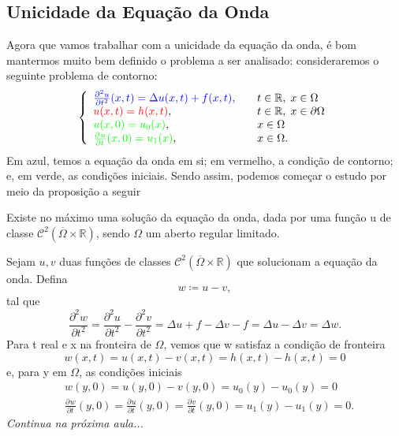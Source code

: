 \documentclass[../pde_notes.tex]{subfiles}
\begin{document}
\subsection{Unicidade da Equação da Onda}
Agora que vamos trabalhar com a unicidade da equação da onda, é bom mantermos muito bem definido o problema a ser analisado: consideraremos o seguinte problema de contorno:
\[
	\left\{\begin{array}{ll}
		{\color{blue}\frac{\partial^{2}u}{\partial t^{2}}(x, t) = \Delta u(x, t) + f(x, t),} & \quad t\in \mathbb{R},\; x\in \Omega           \\
		{\color{red}u(x, t) = h(x, t)},                                                      & \quad t\in \mathbb{R}, \; x\in \partial \Omega \\
		{\color{green}u(x, 0) = u_{0}(x)},                                                   & \quad x\in \Omega                              \\
		{\color{green}\frac{\partial^{}u}{\partial t^{}}(x, 0) = u_1(x)},                    & \quad x\in \Omega .
	\end{array}\right.
\]
Em azul, temos a {\color{blue} equação da onda em si}; em vermelho, a {\color{red}condição de contorno}; e, em verde, as {\color{green}condições iniciais}.
Sendo assim, podemos começar o estudo por meio da proposição a seguir

\begin{prop*}
	Existe no máximo uma solução da equação da onda, dada por uma função u de classe \(\mathcal{C}^{2}(\overline{\Omega }\times \mathbb{R})\), sendo \(\Omega \) um aberto regular limitado.
\end{prop*}
\begin{proof*}
	Sejam \(u, v\) duas funções de classes \(\mathcal{C}^{2}(\overline{\Omega }\times \mathbb{R})\) que solucionam a equação da onda. Defina
	\[
		w\coloneqq u - v,
	\]
	tal que
	\[
		\frac{\partial^{2}w}{\partial t^{2}} = \frac{\partial^{2}u}{\partial t^{2}} - \frac{\partial^{2}v}{\partial t^{2}} = \Delta u + f - \Delta v - f = \Delta u - \Delta v = \Delta w.
	\]
	Para t real e x na fronteira de \(\Omega \), vemos que w satisfaz a condição de fronteira
	\[
		w(x, t) = u(x, t) - v(x, t) = h(x, t) - h (x, t) = 0
	\]
	e, para y em \(\Omega \), as condições iniciais
	\begin{align*}
		 & w(y, 0) = u(y, 0) - v(y, 0) = u_{0}(y) - u_{0}(y) = 0                                                                                                 \\
		 & \frac{\partial^{}w}{\partial t^{}}(y, 0) = \frac{\partial^{}u}{\partial t^{}}(y, 0) = \frac{\partial^{}v}{\partial t^{}}(y, 0) = u_1(y) - u_1(y) = 0.
	\end{align*}
	\hypertarget{next_class_11}{\textit{Continua na próxima aula...}}
\end{proof*}
\end{document}
